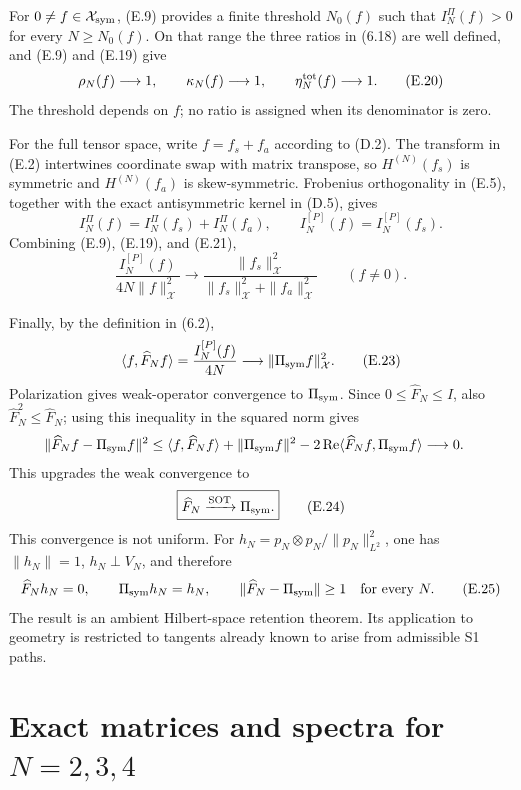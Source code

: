 \documentclass[11pt]{article}
\begin{document}
For \(0\ne f\in\mathcal X_{\rm sym}\), (E.9) provides a finite threshold \(N_0(f)\) such that \(I_N^\Pi(f)>0\) for every \(N\ge N_0(f)\). On that range the three ratios in (6.18) are well defined, and (E.9) and (E.19) give \[ \rho_N(f)\longrightarrow1, \qquad \kappa_N(f)\longrightarrow1, \qquad \eta_N^{\rm tot}(f)\longrightarrow1. \tag{E.20} \] The threshold depends on \(f\); no ratio is assigned when its denominator is zero.

For the full tensor space, write \(f=f_s+f_a\) according to (D.2). The transform in (E.2) intertwines coordinate swap with matrix transpose, so \(H^{(N)}(f_s)\) is symmetric and \(H^{(N)}(f_a)\) is skew-symmetric. Frobenius orthogonality in (E.5), together with the exact antisymmetric kernel in (D.5), gives \[ I_N^\Pi(f)=I_N^\Pi(f_s)+I_N^\Pi(f_a), \qquad I_N^{[P]}(f)=I_N^{[P]}(f_s). \tag{E.21} \] Combining (E.9), (E.19), and (E.21), \[ \frac{I_N^{[P]}(f)}{4N\|f\|_{\mathcal X}^2} \longrightarrow \frac{\|f_s\|_{\mathcal X}^2} {\|f_s\|_{\mathcal X}^2+\|f_a\|_{\mathcal X}^2} \qquad(f\ne0). \tag{E.22} \]

Finally, by the definition in (6.2), \[ \langle f,\widehat F_Nf\rangle =\frac{I_N^{[P]}(f)}{4N} \longrightarrow\|\Pi_{\rm sym}f\|_{\mathcal X}^2. \tag{E.23} \] Polarization gives weak-operator convergence to \(\Pi_{\rm sym}\). Since \(0\le\widehat F_N\le I\), also \(\widehat F_N^2\le\widehat F_N\); using this inequality in the squared norm gives \[ \begin{aligned} \|\widehat F_Nf-\Pi_{\rm sym}f\|^2 &\le\langle f,\widehat F_Nf\rangle +\|\Pi_{\rm sym}f\|^2 -2\operatorname{Re} \langle\widehat F_Nf,\Pi_{\rm sym}f\rangle \longrightarrow0. \end{aligned} \] This upgrades the weak convergence to \[ \boxed{\widehat F_N\xrightarrow{\rm SOT}\Pi_{\rm sym}.} \tag{E.24} \] This convergence is not uniform. For \(h_N=p_N\otimes p_N/\|p_N\|_{L^2}^2\), one has \(\|h_N\|=1\), \(h_N\perp V_N\), and therefore \[ \widehat F_Nh_N=0, \qquad \Pi_{\rm sym}h_N=h_N, \qquad \|\widehat F_N-\Pi_{\rm sym}\|\ge1 \quad\text{for every }N. \tag{E.25} \] The result is an ambient Hilbert-space retention theorem. Its application to geometry is restricted to tangents already known to arise from admissible S1 paths.

\section{Exact matrices and spectra for $N=2,3,4$}
\end{document}
